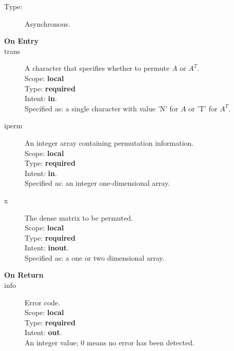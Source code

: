 \begin{description}
\item[Type:] Asynchronous.
\item[\bf On Entry]
\item[trans] A character that specifies whether to permute $A$  or $A^T$.\\
Scope: {\bf local} \\
Type: {\bf required}\\
Intent: {\bf in}.\\
Specified as: a single character with value 'N' for $A$ or 'T' for $A^T$.\\
\item[iperm] An integer array containing permutation information.\\
Scope: {\bf local} \\
Type: {\bf required}\\
Intent: {\bf in}.\\
Specified as: an integer one-dimensional array.\\
\item[x] The dense matrix to be permuted.\\
Scope: {\bf local} \\
Type: {\bf required}\\
Intent: {\bf inout}.\\
Specified as: a one or two dimensional array.\\
\end{description}

\begin{description}
\item[\bf On Return]
\item[info] Error code.\\
Scope: {\bf local} \\
Type: {\bf required} \\
Intent: {\bf out}.\\
An integer value; 0 means no error has been detected. 
\end{description}


%
%


